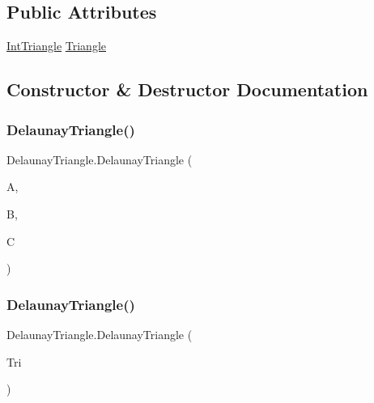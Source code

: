 \subsection*{Public Attributes}
\begin{DoxyCompactItemize}
\item 
\mbox{\hyperlink{struct_int_triangle}{Int\+Triangle}} \mbox{\hyperlink{struct_delaunay_triangle_ade0daceebe739c61341e33e5dddb2efc}{Triangle}}
\end{DoxyCompactItemize}


\subsection{Constructor \& Destructor Documentation}
\mbox{\label{struct_delaunay_triangle_a3346e0ff1d4d37b31293359750e28548}} 
\subsubsection{\texorpdfstring{Delaunay\+Triangle()}{DelaunayTriangle()}\hspace{0.1cm}{\footnotesize\ttfamily [1/2]}}
{\footnotesize\ttfamily Delaunay\+Triangle.\+Delaunay\+Triangle (\begin{DoxyParamCaption}\item[{int}]{A,  }\item[{int}]{B,  }\item[{int}]{C }\end{DoxyParamCaption})}

\mbox{\label{struct_delaunay_triangle_a98d84cc9db0152ca7bd5e7181a54382e}} 
\subsubsection{\texorpdfstring{Delaunay\+Triangle()}{DelaunayTriangle()}\hspace{0.1cm}{\footnotesize\ttfamily [2/2]}}
{\footnotesize\ttfamily Delaunay\+Triangle.\+Delaunay\+Triangle (\begin{DoxyParamCaption}\item[{\mbox{\hyperlink{struct_int_triangle}{Int\+Triangle}}}]{Tri }\end{DoxyParamCaption})}



